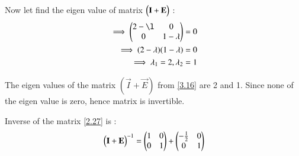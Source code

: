 \documentclass[journal,12pt,twocolumn]{IEEEtran}
\begin{document}
Now let find the eigen value of matrix $\begin{pmatrix}\mathbf{I} + \mathbf{E}\end{pmatrix}$ :
\begin{align}
\implies \myvec{2 - \l  & 0 \\ 0  &  1 - \lambda} = 0\\
\implies (2-\lambda)(1 - \lambda) = 0\\
\implies \lambda_1 = 2, \lambda_2 = 1 \label{3.16}
\end{align}
 
The eigen values of the matrix $(\vec{I} + \vec{E})$ from \eqref{3.16} are  2 and 1. Since none of the eigen value is zero, hence matrix is invertible.

%
%
%
Inverse of the matrix \eqref{2.27} is :
\begin{align}
  \begin{pmatrix}\mathbf{I} + \mathbf{E}\end{pmatrix}^{-1} =\begin{pmatrix}1 & 0 \\ 0 & 1\end{pmatrix} +  \begin{pmatrix} -\frac{1}{2} & 0 \\ 0 & 1\end{pmatrix} \label{3.19}
\end{align}
	
\end{document}
